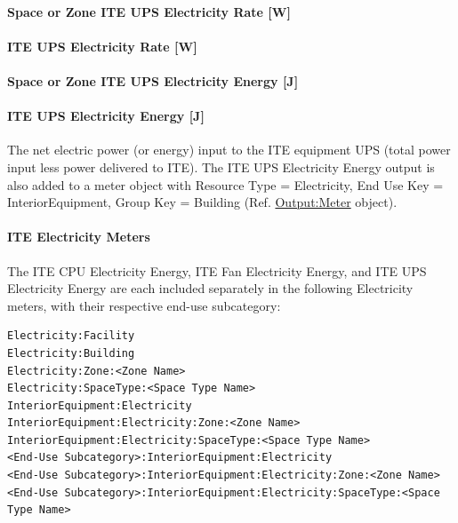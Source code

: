 \paragraph{Space or Zone ITE UPS Electricity Rate {[}W{]}}\label{zone-ite-ups-electric-power-w}

\paragraph{ITE UPS Electricity Rate {[}W{]}}\label{ite-ups-electric-power-w}

\paragraph{Space or Zone ITE UPS Electricity Energy {[}J{]}}\label{zone-ite-ups-electric-energy-j}

\paragraph{ITE UPS Electricity Energy {[}J{]}}\label{ite-ups-electric-energy-j}

The net electric power (or energy) input to the ITE equipment UPS (total power input less power delivered to ITE). The ITE UPS Electricity Energy output is also added to a meter object with Resource Type = Electricity, End Use Key = InteriorEquipment, Group Key = Building (Ref. \hyperref[outputmeter-and-outputmetermeterfileonly]{Output:Meter} object).

\paragraph{ITE Electricity Meters}\label{ite-electricity-meters}

 The ITE CPU Electricity Energy, ITE Fan Electricity Energy, and ITE UPS Electricity Energy are each included separately in the following Electricity meters, with their respective end-use subcategory:
\begin{lstlisting}
Electricity:Facility
Electricity:Building
Electricity:Zone:<Zone Name>
Electricity:SpaceType:<Space Type Name>
InteriorEquipment:Electricity
InteriorEquipment:Electricity:Zone:<Zone Name>
InteriorEquipment:Electricity:SpaceType:<Space Type Name>
<End-Use Subcategory>:InteriorEquipment:Electricity
<End-Use Subcategory>:InteriorEquipment:Electricity:Zone:<Zone Name>
<End-Use Subcategory>:InteriorEquipment:Electricity:SpaceType:<Space Type Name>
\end{lstlisting}

